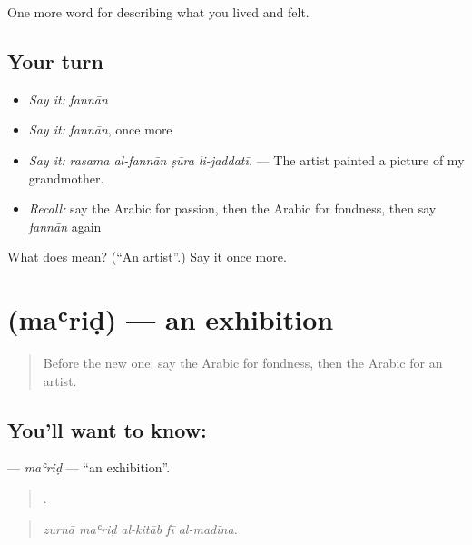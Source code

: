 \begin{grammarlens}[title={What you've built}]
One more word for describing what you lived and felt.
\end{grammarlens}

\subsection*{Your turn}
\begin{itemize}
\raggedright
  \item \emph{Say it:} \emph{fannān}
  \item \emph{Say it:} \emph{fannān}, once more
  \item \emph{Say it:} \emph{rasama al-fannān ṣūra li-jaddatī.} — The artist painted a picture of my grandmother.
  \item \emph{Recall:} say the Arabic for passion, then the Arabic for fondness, then say \emph{fannān} again
\end{itemize}

\begin{tcolorbox}[breakable,colback=teal!4,colframe=teal!35!black,title={Before you move on}]
What does  mean? (\textquotedblleft{}An artist\textquotedblright{}.) Say it once more.
\end{tcolorbox}
\section[\texorpdfstring{\ar{معرض} (maʿriḍ)}{معرض (maʿriḍ)}]{ (maʿriḍ) — an exhibition}

\label{lesson:AR-C541-marid}



\begin{quote}
Before the new one: say the Arabic for fondness, then the Arabic for an artist.
\end{quote}

\subsection*{You'll want to know: }
\textbf{} — \emph{maʿriḍ} — \textquotedblleft{}an exhibition\textquotedblright{}.

\begin{quote}
    .
\end{quote}

\begin{quote}
\emph{zurnā maʿriḍ al-kitāb fī al-madīna.}
\end{quote}

